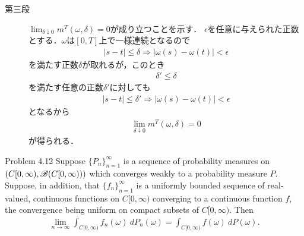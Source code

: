 \begin{sketch}
\begin{description}
			\item[第三段]
				$\lim_{\delta \downarrow 0}m^T(\omega,\delta) = 0$が成り立つことを示す．
				$\epsilon$を任意に与えられた正数とする．$\omega$は$[0,T]$上で一様連続となるので
				\begin{align}
					|s-t| \leq \delta \Longrightarrow |\omega(s) - \omega(t)| < \epsilon
				\end{align}
				を満たす正数$\delta$が取れるが，このとき
				\begin{align}
					\delta' \leq \delta
				\end{align}
				を満たす任意の正数$\delta'$に対しても
				\begin{align}
					|s-t| \leq \delta' \Longrightarrow |\omega(s) - \omega(t)| < \epsilon
				\end{align}
				となるから
				\begin{align}
					\lim_{\delta \downarrow 0}m^T(\omega,\delta) = 0
				\end{align}
				が得られる．
				\QED
		\end{description}
	\end{sketch}
	
	\begin{itembox}[l]{Problem 4.12}
		Suppose $\{P_n\}_{n=1}^\infty$ is a sequence of probability measures on
		$\left( C[0,\infty),\mathscr{B}(C[0,\infty)) \right)$ which converges weakly to a probability
		measure $P$. Suppose, in addition, that $\{f_n\}_{n=1}^\infty$ is a uniformly bounded sequence
		of real-valued, continuous functions on $C[0,\infty)$ converging to a continuous function $f$,
		the convergence being uniform on compact subsets of $C[0,\infty)$. Then
		\begin{align}
			\lim_{n \to \infty} \int_{C[0,\infty)} f_n(\omega)\ dP_n(\omega)
			= \int_{C[0,\infty)} f(\omega)\ dP(\omega).
		\end{align}
	\end{itembox}
	
